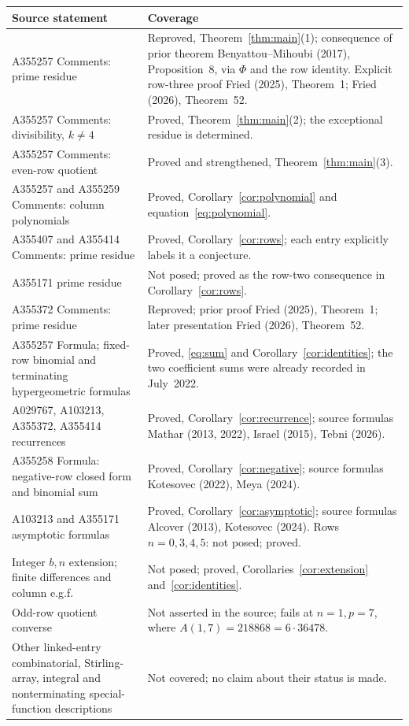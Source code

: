 \documentclass[11pt]{article}
\begin{document}
\begin{center}
\small
\begin{longtable}{@{}p{.42\linewidth}p{.51\linewidth}@{}}
\toprule
Source statement & Coverage \\
\midrule
A355257 Comments: prime residue & Reproved, Theorem~\ref{thm:main}(1);
consequence of prior theorem Benyattou--Mihoubi (2017),
Proposition~8, via $\Phi$ and the row identity. Explicit row-three
proof Fried (2025), Theorem~1; Fried (2026), Theorem~52. \\
A355257 Comments: divisibility, $k\ne4$ & Proved,
Theorem~\ref{thm:main}(2); the exceptional residue is determined. \\
A355257 Comments: even-row quotient & Proved and strengthened,
Theorem~\ref{thm:main}(3). \\
A355257 and A355259 Comments: column polynomials & Proved,
Corollary~\ref{cor:polynomial} and equation~\eqref{eq:polynomial}. \\
A355407 and A355414 Comments: prime residue & Proved,
Corollary~\ref{cor:rows}; each entry explicitly labels it a conjecture. \\
A355171 prime residue & Not posed; proved as the row-two consequence
in Corollary~\ref{cor:rows}. \\
A355372 Comments: prime residue & Reproved; prior proof Fried (2025),
Theorem~1; later presentation Fried (2026), Theorem~52. \\
A355257 Formula; fixed-row binomial and terminating hypergeometric formulas
& Proved, \eqref{eq:sum} and Corollary~\ref{cor:identities};
the two coefficient sums were already recorded in July~2022. \\
A029767, A103213, A355372, A355414 recurrences & Proved,
Corollary~\ref{cor:recurrence}; source formulas Mathar (2013, 2022),
Israel (2015), Tebni (2026). \\
A355258 Formula: negative-row closed form and binomial sum & Proved,
Corollary~\ref{cor:negative}; source formulas Kotesovec (2022), Meya (2024). \\
A103213 and A355171 asymptotic formulas & Proved,
Corollary~\ref{cor:asymptotic}; source formulas Alcover (2013),
Kotesovec (2024). Rows $n=0,3,4,5$: not posed; proved. \\
Integer $b,n$ extension; finite differences and column e.g.f.
& Not posed; proved, Corollaries~\ref{cor:extension} and~\ref{cor:identities}. \\
Odd-row quotient converse & Not asserted in the source;
fails at $n=1,p=7$, where $A(1,7)=218868=6\cdot36478$. \\
Other linked-entry combinatorial, Stirling-array, integral and
nonterminating special-function descriptions & Not covered; no claim about
their status is made. \\
\bottomrule
\end{longtable}
\end{center}
\end{document}
